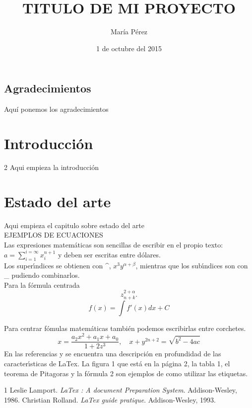 \documentclass[12pt,a4paper,spanish]{book}
\begin{document}
\title{TITULO DE MI PROYECTO}
\author{Mar\'ia P\'erez}
\date{1 de octubre del 2015}
\maketitle
\tableofcontents
\newpage
\thispagestyle{empty}
\section*{Agradecimientos}
Aqu\'{i} ponemos los agradecimientos
\chapter{Introducci\'on}
2
Aqui empieza la introducci\'on
\chapter{Estado del arte}
Aqui empieza el capitulo sobre estado del arte\\
EJEMPLOS DE ECUACIONES\\
Las expresiones matem\'{a}ticas son
sencillas de escribir en el propio texto:
$a=\sum_{i=1}^{i=\infty} x_i^{n+1}$
y deben ser escritas entre d\'{o}lares. \\
Los super\'{\i}ndices
se obtienen con \^{},
$x^3 y^{\alpha + \beta}$, mientras que los
sub\'{\i}ndices son con \_  pudiendo
combinarlos.\\
Para la f\'{o}rmula  centrada
$$z^{2+\alpha}_{n+k}.$$
\begin{equation}
\label{integral}
f(x)=\int{f'(x)dx}+C
\end{equation}

Para centrar f\'omulas matem\'aticas tambi\'en podemos escribirlas entre corchetes. 
\[
x=\frac{a_2 x^2 + a_1 x + a_0}{1+2z^3}, \quad
x+y^{2n+2}=\sqrt{b^2-4ac}
\]
En las referencias \cite{La86} y \cite{Ro93} se encuentra una
descripci\'on en profundidad de las caracter\'{\i}sticas de
LaTex. La figura 1 que est\'a en la p\'agina 2, la tabla 1, el teorema
de Pitagoras y la f\'ormula 2 son ejemplos
de como utilizar las etiquetas.


\begin{thebibliography}{1}
 Leslie Lamport.
{\em LaTex : A document Preparation System}.
Addison-Wesley, 1986.
 Christian Rolland.
{\em LaTex guide pratique}.
Addison-Wesley, 1993.
\end{thebibliography}
\end{document}
